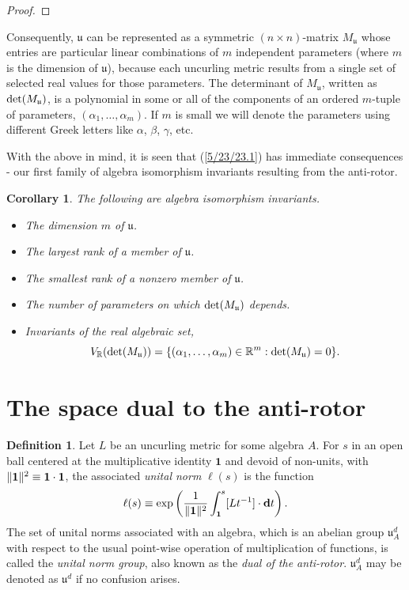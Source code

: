 \documentclass{amsart}
\numberwithin{equation}{section}
\newtheorem{corollary}[theorem]{Corollary}
\theoremstyle{definition}
\newtheorem{definition}[theorem]{Definition}
\numberwithin{theorem}{section}
\begin{document}
\begin{proof}
\end{proof}

Consequently, $\mathfrak{u}$ can be represented as a symmetric $(n\times n)$-matrix $M_{\mathfrak{u}}$ whose entries are particular linear combinations of $m$ independent parameters (where $m$ is the dimension of $\mathfrak{u}$), because each uncurling metric results from a single set of selected real values for those parameters.  The determinant of $M_{\mathfrak{u}}$, written as ${\rm det}(M_{\mathfrak{u}})$, is a polynomial in some or all of the components of an ordered $m$-tuple of parameters, $(\alpha_1,\dots,\alpha_m)$.  If $m$ is small  we will denote the parameters using different Greek letters like $\alpha$, $\beta$, $\gamma$, etc. 

   With the above in mind, it is seen that (\ref{5/23/23.1}) has immediate consequences - our first family of algebra isomorphism invariants resulting from the anti-rotor. 
   
\bigskip
           
  \begin{corollary}\label{8/18/23.2} The following are algebra isomorphism invariants. \begin{itemize} \item The dimension $m$ of $\mathfrak{u}$.   \item The largest rank  of a member of $\mathfrak{u}$.  \item The smallest rank of a nonzero member of $\mathfrak{u}$. \item The number of parameters on which ${\rm det}(M_{\mathfrak{u}})$ depends. \item Invariants of the real algebraic set, \[V_\mathbb{R}({\rm det}(M_{\mathfrak{u}})) = \{(\alpha_1,\dots,\alpha_m)\in\mathbb{R}^m: {\rm det}(M_{\mathfrak{u}}) = 0 \}.\] \end{itemize} \end{corollary}

\newpage

\section{The space dual to the anti-rotor}
  \begin{definition}\label{9/21/23.2} Let $L$ be an uncurling metric for some algebra $A$.  For $s$ in an open ball centered at the multiplicative identity $\mathbf{1}$ and devoid of non-units, with $\|{\bf 1}\|^2 \equiv \mathbf{1}\cdot\mathbf{1}$, the associated {\it unital norm} $ \ell(s)$ is the function 
  \begin{equation}\label{11/7/20.2}   \ell(s) \equiv \exp\left(\frac{1}{\|{\bf 1}\|^2}\int_{\bf 1}^s [Lt^{-1}]\cdot \mathbf{d}t\right).\end{equation} 
   The set of unital norms associated with an algebra, which is an abelian group $\mathfrak{u}^d_A$ with respect to the usual point-wise operation of multiplication of functions, is called the {\it unital norm group}, also known as the {\it dual of the anti-rotor}. $\mathfrak{u}^d_A$ may be denoted as $\mathfrak{u}^d$ if no confusion arises. \end{definition} 
   
\end{document}
